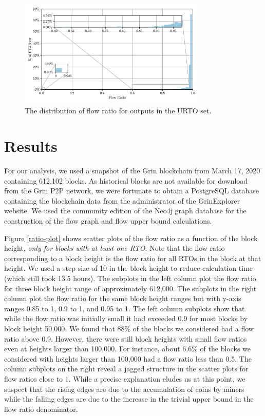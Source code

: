 \begin{figure}[!b]
  \centering
  \includegraphics[width=0.8\textwidth]{Figures/utxo_hist2.pdf}
  \caption{The distribution of flow ratio for outputs in the URTO set.}
  \label{utxo-plot}
\end{figure}

\section{Results}
\label{scn:Results}


For our analysis, we used a snapshot of the Grin blockchain from March 17, 2020 containing 612,102 blocks.
As historical blocks are not available for download from the Grin P2P network, we were fortunate to obtain a PostgreSQL database containing the blockchain data from the administrator of the GrinExplorer website.
We used the community edition of the Neo4j graph database for the construction of the flow graph and flow upper bound calculations.


Figure \ref{ratio-plot} shows scatter plots of the flow ratio as a function of the block height, \textit{only for blocks with at least one RTO}. Note that the flow ratio corresponding to a block height is the flow ratio for all RTOs in the block at that height. 
We used a step size of 10 in the block height to reduce calculation time (which still took 13.5 hours). 
The subplots in the left column plot the flow ratio for three block height range of approximately 612,000. 
The subplots in the right column plot the flow ratio for the same block height ranges but with y-axis ranges 0.85 to 1, 0.9 to 1, and 0.95 to 1. 
The left column subplots show that while the flow ratio was initially small it had exceeded 0.9 for most blocks by block height 50,000. 
We found that 88\% of the blocks we considered had a flow ratio above 0.9. However, there were still block heights with small flow ratios even at heights larger than 100,000. 
For instance, about 6.6\% of the blocks we considered with heights larger than 100,000 had a flow ratio less than 0.5.
The column subplots on the right reveal a jagged structure in the scatter plots for flow ratios close to 1. While a precise explanation eludes us at this point, we suspect that the rising edges are due to the accumulation of coins by miners while the falling edges are due to the increase in the trivial upper bound in the flow ratio denominator.

